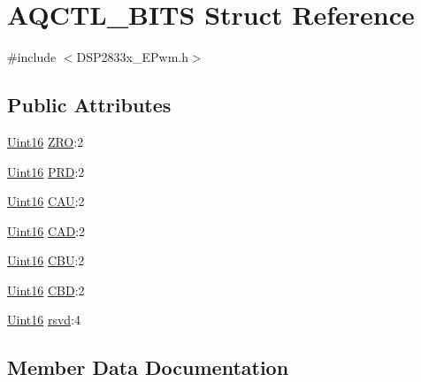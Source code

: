 \hypertarget{struct_a_q_c_t_l___b_i_t_s}{}\section{A\+Q\+C\+T\+L\+\_\+\+B\+I\+T\+S Struct Reference}
\label{struct_a_q_c_t_l___b_i_t_s}


{\ttfamily \#include $<$D\+S\+P2833x\+\_\+\+E\+Pwm.\+h$>$}

\subsection*{Public Attributes}
\begin{DoxyCompactItemize}
\item 
\hyperlink{_d_s_p2833x___device_8h_a59a9f6be4562c327cbfb4f7e8e18f08b}{Uint16} \hyperlink{struct_a_q_c_t_l___b_i_t_s_a364e3885e2683e062df9092186017c2f}{Z\+R\+O}\+:2
\item 
\hyperlink{_d_s_p2833x___device_8h_a59a9f6be4562c327cbfb4f7e8e18f08b}{Uint16} \hyperlink{struct_a_q_c_t_l___b_i_t_s_a5196957c15b6868af4e0415c001ca76f}{P\+R\+D}\+:2
\item 
\hyperlink{_d_s_p2833x___device_8h_a59a9f6be4562c327cbfb4f7e8e18f08b}{Uint16} \hyperlink{struct_a_q_c_t_l___b_i_t_s_a5037c104c7bdf74df20fafdeab3e2583}{C\+A\+U}\+:2
\item 
\hyperlink{_d_s_p2833x___device_8h_a59a9f6be4562c327cbfb4f7e8e18f08b}{Uint16} \hyperlink{struct_a_q_c_t_l___b_i_t_s_af6baa44c4ecdae2507a11ded51734390}{C\+A\+D}\+:2
\item 
\hyperlink{_d_s_p2833x___device_8h_a59a9f6be4562c327cbfb4f7e8e18f08b}{Uint16} \hyperlink{struct_a_q_c_t_l___b_i_t_s_a9b4625cfb7b62fa9d1227773bfa188ea}{C\+B\+U}\+:2
\item 
\hyperlink{_d_s_p2833x___device_8h_a59a9f6be4562c327cbfb4f7e8e18f08b}{Uint16} \hyperlink{struct_a_q_c_t_l___b_i_t_s_add9d636c9f98e2a27b1fe4084d7f79df}{C\+B\+D}\+:2
\item 
\hyperlink{_d_s_p2833x___device_8h_a59a9f6be4562c327cbfb4f7e8e18f08b}{Uint16} \hyperlink{struct_a_q_c_t_l___b_i_t_s_a8ac84438d588671b2e7d9f6a48eb4092}{rsvd}\+:4
\end{DoxyCompactItemize}


\subsection{Member Data Documentation}
\hypertarget{struct_a_q_c_t_l___b_i_t_s_af6baa44c4ecdae2507a11ded51734390}{}
